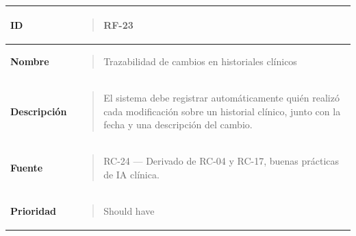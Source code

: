 \documentclass[
]{article}
\newcounter{none} %
\begin{document}
{\def\LTcaptype{none} %
\begin{longtable}[]{@{}
  >{\raggedright\arraybackslash}p{}
  >{\raggedright\arraybackslash}p{}@{}}
\toprule\noalign{}
\begin{minipage}[b]{\linewidth}\raggedright
\textbf{ID}
\end{minipage} & \begin{minipage}[b]{\linewidth}\raggedright
\begin{quote}
RF-23
\end{quote}
\end{minipage} \\
\midrule\noalign{}
\endhead
\bottomrule\noalign{}
\endlastfoot
\textbf{Nombre} & \begin{minipage}[t]{\linewidth}\raggedright
\begin{quote}
Trazabilidad de cambios en historiales clínicos
\end{quote}
\end{minipage} \\
\textbf{Descripción} & \begin{minipage}[t]{\linewidth}\raggedright
\begin{quote}
El sistema debe registrar automáticamente quién realizó cada
modificación sobre un historial clínico, junto con la fecha y una
descripción del cambio.
\end{quote}
\end{minipage} \\
\textbf{Fuente} & \begin{minipage}[t]{\linewidth}\raggedright
\begin{quote}
RC-24 --- Derivado de RC-04 y RC-17, buenas prácticas de IA clínica.
\end{quote}
\end{minipage} \\
\textbf{Prioridad} & \begin{minipage}[t]{\linewidth}\raggedright
\begin{quote}
Should have
\end{quote}
\end{minipage} \\
\end{longtable}
}
\end{document}
